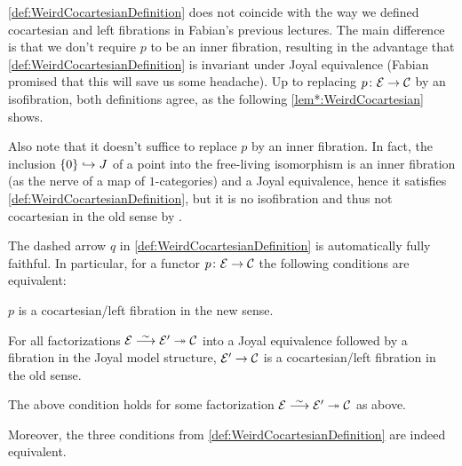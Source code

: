 \documentclass[a4paper, 10pt, oneside, DIV=9, chapterprefix=true, numbers=enddot,bibliography=totoc]{scrbook}
\begin{document}
\begin{warn*}
	\cref{def:WeirdCocartesianDefinition} does not coincide with the way we defined cocartesian and left fibrations in Fabian's previous lectures. The main difference is that we don't require $p$ to be an inner fibration, resulting in the advantage that \cref{def:WeirdCocartesianDefinition} is invariant under Joyal equivalence (Fabian promised that this will save us some headache). Up to replacing $p\colon \Ee\morphism\Cc$ by an isofibration, both definitions agree, as the following \cref{lem*:WeirdCocartesian} shows.
	
	Also note that it doesn't suffice to replace $p$ by an inner fibration. In fact, the inclusion $\{0\}\monomorphism J$ of a point into the free-living isomorphism is an inner fibration (as the nerve of a map of $1$-categories) and a Joyal equivalence, hence it satisfies \cref{def:WeirdCocartesianDefinition}, but it is no isofibration and thus not cocartesian in the old sense by \cite[Proposition~IX.2]{HigherCatsII}.
\end{warn*}
\begin{lem*}\label{lem*:WeirdCocartesian}
	The dashed arrow $q$ in \cref{def:WeirdCocartesianDefinition} is automatically fully faithful. In particular, for a functor $p\colon \Ee\morphism\Cc$ the following conditions are equivalent:
	\begin{alphanumerate}
		\item $p$ is a cocartesian/left fibration in the new sense.
		\item For all factorizations $\Ee\isomorphism\Ee'\epimorphism\Cc$ into a Joyal equivalence followed by a fibration in the Joyal model structure, $\Ee'\morphism\Cc$ is a cocartesian/left fibration in the old sense.
		\item The above condition holds for some factorization $\Ee\isomorphism\Ee'\epimorphism\Cc$ as above.
	\end{alphanumerate}
	Moreover, the three conditions from \cref{def:WeirdCocartesianDefinition} are indeed equivalent.
\end{lem*}
\end{document}
